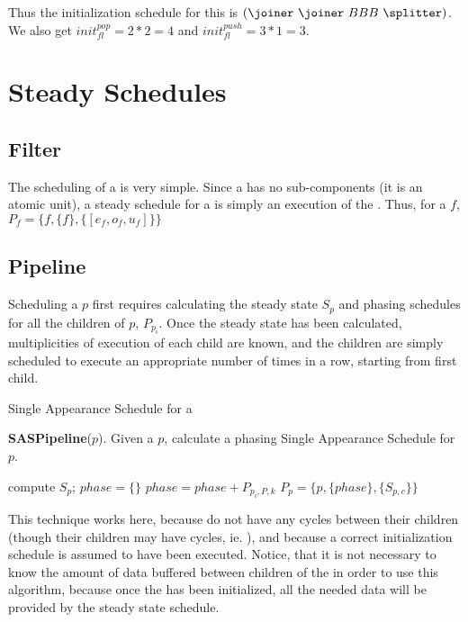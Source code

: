 Thus the initialization schedule for this {\feedbackloop} is
$({\joiner}\ {\joiner}\ BBB\ {\splitter})$.  We also get
$init^{pop}_{fl} = 2 * 2 = 4$ and $init^{push}_{fl} = 3 * 1 = 3$.

\section{Steady Schedules}

\subsection{Filter}

The scheduling of a {\filter} is very simple.  Since a {\filter} has
no sub-components (it is an atomic unit), a steady schedule for a
{\filter} is simply an execution of the {\filter}.  Thus, for a
{\filter} $f$, $P_f = \{f, \{f\}, \{[e_f,o_f,u_f]\}\}$

\subsection{Pipeline}

Scheduling a {\pipeline} $p$ first requires calculating the steady
state $S_p$ and phasing schedules for all the children of $p$,
$P_{p_i}$. Once the steady state has been calculated,
multiplicities of execution of each child are known, and the
children are simply scheduled to execute an appropriate number of
times in a row, starting from first child.

\begin{algorithm}
\label{alg:sa-pipeline} \caption{Single Appearance Schedule for a
{\pipeline}} {\bf SASPipeline}($p$).  Given a {\pipeline} $p$,
calculate a phasing Single Appearance Schedule for $p$.
\begin{algorithmic}
\STATE compute $S_p$; $phase = \{\}$ 
  \STATE
$phase = phase + P_{p_i, P, k}$ \ENDFOR \ENDFOR \ENDFOR \STATE
$P_p = \{p, \{phase\}, \{S_{p,c}\}\}$
\end{algorithmic}
\end{algorithm}

This technique works here, because {\pipelines} do not have any
cycles between their children (though their children may have
cycles, ie. {\feedbackloops}), and because a correct initialization
schedule is assumed to have been executed.  Notice, that it is not
necessary to know the amount of data buffered between children of
the {\pipeline} in order to use this algorithm, because once the
{\pipeline} has been initialized, all the needed data will be
provided by the steady state schedule.

